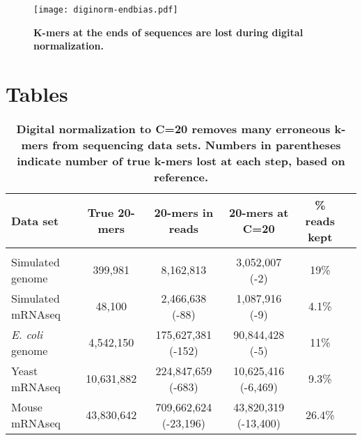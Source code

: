 \documentclass[10pt]{article}
\begin{document}
\begin{figure}[!ht]
\centerline{\texttt{[image: diginorm-endbias.pdf]}}
\caption{
{\bf K-mers at the ends of sequences are lost during digital normalization.}}
\label{fig:endloss}
\end{figure}




\section*{Tables}

\begin{table}[!ht]
\caption{
\bf{Digital normalization to C=20 removes many erroneous k-mers from sequencing data sets.  Numbers
in parentheses indicate number of true k-mers lost at each step, based on reference.}}
\begin{tabular}{|l|c|c|c|c|c|}
Data set & True 20-mers & 20-mers in reads & 20-mers at C=20 & \% reads kept\\
\hline \\
Simulated genome & 399,981 & 8,162,813 & 3,052,007 (-2) & 19\% \\
Simulated mRNAseq & 48,100 & 2,466,638 (-88) & 1,087,916 (-9) & 4.1\% \\
{\em E. coli} genome & 4,542,150 & 175,627,381 (-152) & 90,844,428 (-5) & 11\% \\
Yeast mRNAseq & 10,631,882 & 224,847,659 (-683) & 10,625,416 (-6,469) & 9.3\% \\
Mouse mRNAseq & 43,830,642 & 709,662,624 (-23,196) & 43,820,319 (-13,400) & 26.4\% \\
\end{tabular}
\begin{flushleft}
\end{flushleft}
\label{tab:normC20}
\end{table}
\end{document}
